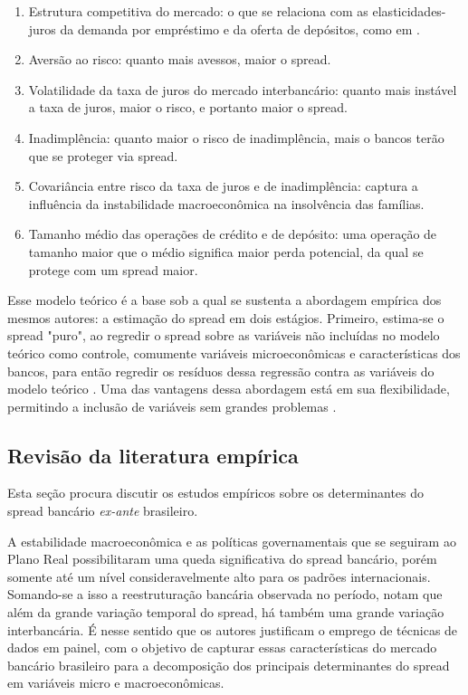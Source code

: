 \documentclass[a4paper,
               article,
               12pt,
               openany,
               oneside,
               english,
               brazil]{abntex2}
\numberwithin{equation}{section}
\begin{document}
	\begin{enumerate}
		\item Estrutura competitiva do mercado: o que se relaciona com as elasticidades-juros da demanda por empréstimo e da oferta de depósitos, como em \textcite{klein}.
		\item Aversão ao risco: quanto mais avessos, maior o spread.
		\item Volatilidade da taxa de juros do mercado interbancário: quanto mais instável a taxa de juros, maior o risco, e portanto maior o spread.
		\item Inadimplência: quanto maior o risco de inadimplência, mais o bancos terão que se proteger via spread.
		\item Covariância entre risco da taxa de juros e de inadimplência: captura a influência da instabilidade macroeconômica na insolvência das famílias.
		\item Tamanho médio das operações de crédito e de depósito: uma operação de tamanho maior que o médio significa maior perda potencial, da qual se protege com um spread maior.
	\end{enumerate}

    Esse modelo teórico é a base sob a qual se sustenta a abordagem empírica dos mesmos autores: a estimação do spread em dois estágios. Primeiro, estima-se o spread "puro", ao regredir o spread sobre as variáveis não incluídas no modelo teórico como controle, comumente variáveis microeconômicas e características dos bancos, para então regredir os resíduos dessa regressão contra as variáveis do modelo teórico \textcite{maudos}. Uma das vantagens dessa abordagem está em sua flexibilidade, permitindo a inclusão de variáveis sem grandes problemas \textcite[p.~2]{almeida15}.

\subsection{Revisão da literatura empírica}

    Esta seção procura discutir os estudos empíricos sobre os determinantes do spread bancário \textit{ex-ante} brasileiro.

    A estabilidade macroeconômica e as políticas governamentais que se seguiram ao Plano Real possibilitaram uma queda significativa do spread bancário, porém somente até um nível consideravelmente alto para os padrões internacionais. Somando-se a isso a reestruturação bancária observada no período, \textcite{afanasieff02} notam que além da grande variação temporal do spread, há também uma grande variação interbancária. É nesse sentido que os autores justificam o emprego de técnicas de dados em painel, com o objetivo de capturar essas características do mercado bancário brasileiro para a decomposição dos principais determinantes do spread em variáveis micro e macroeconômicas.
\end{document}

